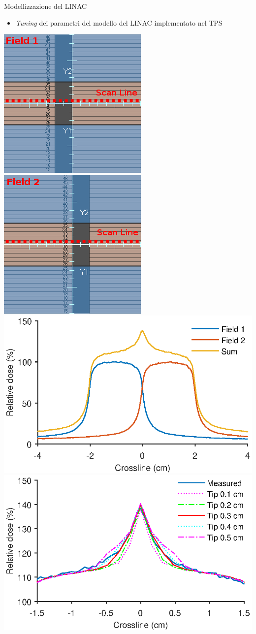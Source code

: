 \documentclass{beamer}
\begin{document}
\begin{frame}{Modellizzazione del LINAC}
\begin{itemize}
\scriptsize
{}
\item \alert{\textit{Tuning} dei parametri del modello del LINAC implementato nel TPS}
\end{itemize}
\vspace{.5cm}
\centering
\includegraphics[width=.3\textwidth]{../cap2/tip5.PNG} $\quad$
\includegraphics[width=.3\textwidth]{../cap2/tip6.PNG}\\ \vspace{.5cm}
\includegraphics[width=.5\textwidth]{../cap2/MLC_Plots/Abutted/abutted_m.eps}
\includegraphics[width=.5\textwidth]{../cap2/MLC_Plots/Abutted/PlotMLC_Tip_modeling.eps}
\end{frame}
\end{document}

